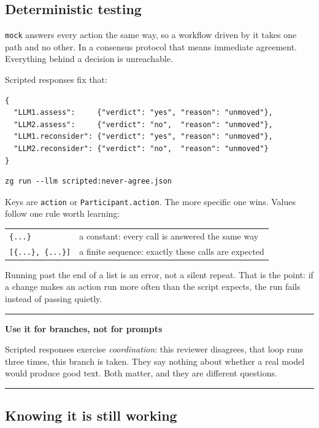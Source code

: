 \documentclass[11pt,a4paper]{article}
\newenvironment{notebox}[1]
{\begin{center}\begin{minipage}{0.94\linewidth}
 \color{ZipperInk}\hrule\vspace{5pt}\textbf{#1}\par\smallskip}
{\vspace{5pt}\hrule\end{minipage}\end{center}}
\begin{document}
\subsection{Deterministic testing}

\texttt{mock} answers every action the same way, so a workflow driven by it
takes one path and no other. In a consensus protocol that means immediate
agreement. Everything behind a decision is unreachable.

Scripted responses fix that:

\begin{lstlisting}
{
  "LLM1.assess":     {"verdict": "yes", "reason": "unmoved"},
  "LLM2.assess":     {"verdict": "no",  "reason": "unmoved"},
  "LLM1.reconsider": {"verdict": "yes", "reason": "unmoved"},
  "LLM2.reconsider": {"verdict": "no",  "reason": "unmoved"}
}
\end{lstlisting}

\begin{lstlisting}[style=shell]
zg run --llm scripted:never-agree.json
\end{lstlisting}

Keys are \texttt{action} or \texttt{Participant.action}. The more specific one
wins. Values follow one rule worth learning:

\begin{center}
\begin{tabularx}{0.95\linewidth}{@{}lX@{}}
\toprule
\texttt{\{...\}} & a constant: every call is answered the same way \\
\texttt{[\{...\}, \{...\}]} & a finite sequence: exactly these calls are expected \\
\bottomrule
\end{tabularx}
\end{center}

Running past the end of a list is an error, not a silent repeat. That is the
point: if a change makes an action run more often than the script expects, the
run fails instead of passing quietly.

\begin{notebox}{Use it for branches, not for prompts}
Scripted responses exercise \emph{coordination}: this reviewer disagrees, that
loop runs three times, this branch is taken. They say nothing about whether a
real model would produce good text. Both matter, and they are different questions.
\end{notebox}

\subsection{Knowing it is still working}
\end{document}
